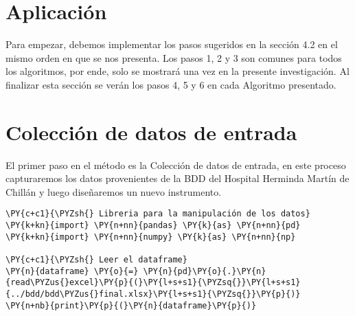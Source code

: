      \hypertarget{apliacaciuxf3n-del-muxe9todo}{%
\section{Aplicación}\label{apliacaciuxf3n-del-muxe9todo}}

Para empezar, debemos implementar los pasos sugeridos en la sección 4.2 en el mismo orden en que se nos presenta. Los pasos 1, 2 y 3 son comunes para todos los algoritmos, por ende, solo se mostrará una vez en la presente investigación. Al finalizar esta sección se verán los pasos 4, 5 y 6 en cada Algoritmo presentado.

    \hypertarget{colecciuxf3n-de-datos-de-entrada}{%
\section{Colección de datos de
entrada}\label{colecciuxf3n-de-datos-de-entrada}}

El primer paso en el método es la Colección de datos de entrada, en este proceso capturaremos los datos provenientes de la BDD del Hospital Herminda Martín de Chillán y luego diseñaremos un nuevo instrumento.

    \begin{tcolorbox}[breakable, size=fbox, boxrule=1pt, pad at break*=1mm,colback=cellbackground, colframe=cellborder]
\begin{Verbatim}[commandchars=\\\{\}]
\PY{c+c1}{\PYZsh{} Libreria para la manipulación de los datos}
\PY{k+kn}{import} \PY{n+nn}{pandas} \PY{k}{as} \PY{n+nn}{pd}
\PY{k+kn}{import} \PY{n+nn}{numpy} \PY{k}{as} \PY{n+nn}{np}

\PY{c+c1}{\PYZsh{} Leer el dataframe}
\PY{n}{dataframe} \PY{o}{=} \PY{n}{pd}\PY{o}{.}\PY{n}{read\PYZus{}excel}\PY{p}{(}\PY{l+s+s1}{\PYZsq{}}\PY{l+s+s1}{../bdd/bdd\PYZus{}final.xlsx}\PY{l+s+s1}{\PYZsq{}}\PY{p}{)}
\PY{n+nb}{print}\PY{p}{(}\PY{n}{dataframe}\PY{p}{)}
\end{Verbatim}
\end{tcolorbox}

